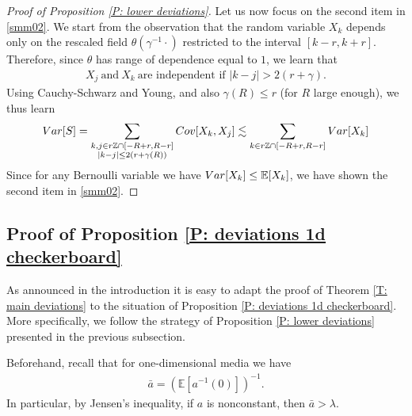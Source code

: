 \documentclass[10pt,a4paper]{amsart}
\newcommand{\E}{\mathbb{E}}
\begin{document}
\begin{proof}[Proof of Proposition \ref{P: lower deviations}]
	Let us now focus on the second item in \eqref{smm02}. We start from the observation that the random variable $ X_k $ depends only on the rescaled field $ \theta ( \gamma^{-1} \cdot )$ restricted to the interval $  [ k - r , k + r ]  $. Therefore, since $ \theta$ has range of dependence equal to $1$, we learn that
	\begin{align*}
		X_{ j } ~ \text{and} ~ X_k ~ \text{are independent if~} | k - j | > 2 ( r + \gamma ) .
	\end{align*}
	Using Cauchy-Schwarz and Young, and also $ \gamma(R) \leq r $ (for $R$ large enough), we thus learn
	\begin{align*}
		{ \rm Var } [ S ]
		= \sum_{ \substack{ k , j  \in r \mathbb{Z} \cap [ - R + r , R -  r  ] \\ | k - j | \leq 2 ( r + \gamma(R) ) } } { \rm Cov } [ X_k , X_j ]
		\lesssim  \sum_{ k \in r \mathbb{Z} \cap [ - R + r , R - r  ] } { \rm Var } [ X_k ]
	\end{align*}
	Since for any Bernoulli variable we have $ { \rm Var } [ X_k ] \leq \mathbb{E} [ X_k ] $, we have shown the second item in \eqref{smm02}.
\end{proof}

\subsection{Proof of Proposition \ref{P: deviations 1d checkerboard}}\label{S: deviations 1d checkerboard}

As announced in the introduction it is easy to adapt the proof of Theorem \ref{T: main deviations} to the situation of Proposition \ref{P: deviations 1d checkerboard}. More specifically, we follow the strategy of Proposition \ref{P: lower deviations} presented in the previous subsection.

Beforehand, recall that for one-dimensional media we have
%
\begin{align*}
    \bar a = ( \E[ a^{ - 1 } ( 0 ) ] )^{ - 1 } .
\end{align*}
%
In particular, by Jensen's inequality, if $ a $ is nonconstant, then $ \bar a > \lambda $.
\end{document}
